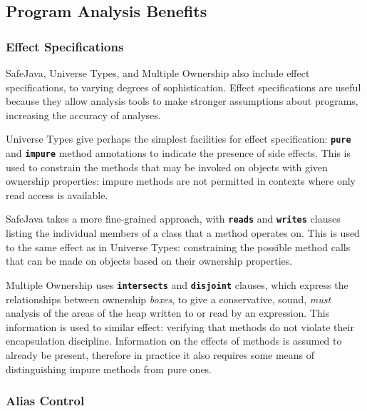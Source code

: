 \documentclass{acm_proc_article-sp}
\begin{document}
\subsection{Program Analysis Benefits}
\label{subsec:program_analysis_benefits}

\subsubsection{Effect Specifications}
\label{subsubsec:benefits_effect_specifications}


SafeJava, Universe Types, and Multiple Ownership also include effect
specifications, to varying degrees of sophistication. Effect specifications are
useful because they allow analysis tools to make stronger assumptions about
programs, increasing the accuracy of analyses.


Universe Types give perhaps the simplest facilities for effect specification:
\textbf{\lstinline|pure|} and \textbf{\lstinline|impure|} method annotations to
indicate the presence of side effects. This is used to constrain the methods
that may be invoked on objects with given ownership properties: impure methods
are not permitted in contexts where only read access is available.

SafeJava takes a more fine-grained approach, with \textbf{\lstinline|reads|} and
\textbf{\lstinline|writes|} clauses listing the individual members of a class
that a method operates on. This is used to the same effect as in Universe Types:
constraining the possible method calls that can be made on objects based on
their ownership properties.

Multiple Ownership uses \textbf{\lstinline|intersects|} and
\textbf{\lstinline|disjoint|} clauses, which express the relationships between
ownership \textit{boxes}, to give a conservative, sound, \textit{must} analysis
of the areas of the heap written to or read by an expression. This information
is used to similar effect: verifying that methods do not violate their
encapsulation discipline. Information on the effects of methods is assumed to
already be present, therefore in practice it also requires some means of
distinguishing impure methods from pure ones.


\subsubsection{Alias Control} \label{subsubsec:benefits_alias_control}
\end{document}
